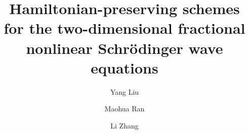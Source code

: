 \documentclass[preprint,compress,3p,10pt,fleqn]{elsarticle}
\numberwithin{equation}{section}
\begin{document}
\begin{frontmatter}



\title{Hamiltonian-preserving schemes for the two-dimensional fractional nonlinear Schr{\"o}dinger wave equations}

\author[myaddress]{Yang Liu}

\author[myaddress,mysecondaddress]{Maohua Ran}


\author[myaddress]{Li Zhang}

\address[myaddress]{School of Mathematical Sciences and V.C. and V.R. Key Lab, Sichuan Normal University, Chengdu 610068, China}

\address[mysecondaddress]{School of Mathematics, Aba Teachers University, Aba 623002, China}



\end{frontmatter}
\end{document}
